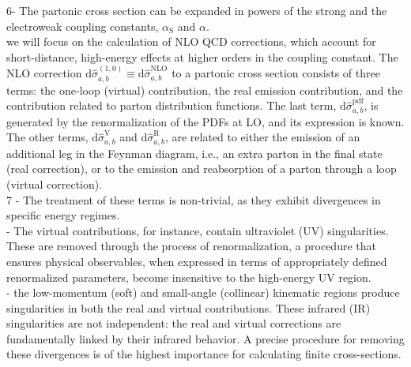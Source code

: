 \documentclass{article}
\begin{document}
6- The partonic cross section can be expanded in powers of the strong and the electroweak coupling constants, $\alpha_{\text{S}}$ and $\alpha$. \\
we will focus on the calculation of NLO QCD corrections, which account for short-distance, high-energy effects at higher orders in the coupling constant. The NLO correction $\text{d} \hat{\sigma}_{a,b}^{(1,0)} \equiv \text{d} \hat{\sigma}_{a,b}^{\mathrm{NLO}} $ to a partonic cross section consists of three terms: the one-loop (virtual) contribution, the real emission contribution, and the contribution related to parton distribution functions. The last term, $\mathrm{d} \hat{\sigma}_{a,b}^{\mathrm{pdf}}$, is generated by the renormalization of the PDFs at LO, and its expression is known. The other terms, $\mathrm{d} \hat{\sigma}_{a,b}^{\mathrm{V}}$ and $\mathrm{d} \hat{\sigma}_{a,b}^{\mathrm{R}}$, are related to either the emission of an additional leg in the Feynman diagram, i.e., an extra parton in the final state (real correction), or to the emission and reabsorption of a parton through a loop (virtual correction).\\

7 - The treatment of these terms is non-trivial, as they exhibit divergences in specific energy regimes. \\
- The virtual contributions, for instance, contain ultraviolet (UV) singularities. These are removed through the process of renormalization, a procedure that ensures physical observables, when expressed in terms of appropriately defined renormalized parameters, become insensitive to the high-energy UV region. \\
- the low-momentum (soft) and small-angle (collinear) kinematic regions produce singularities in both the real and virtual contributions. These infrared (IR) singularities are not independent: the real and virtual corrections are fundamentally linked by their infrared behavior. A precise procedure for removing these divergences is of the highest importance for calculating finite cross-sections. \\
\end{document}
